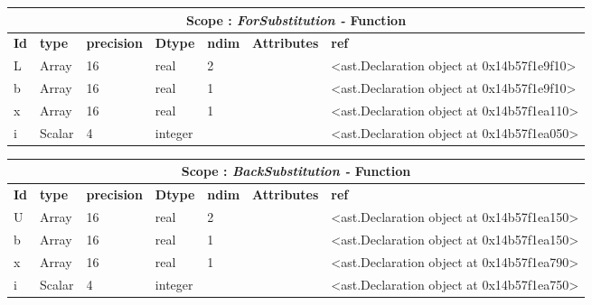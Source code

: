 \documentclass{report}
\begin{document}
\begin{center}
\begin{longtable}{|p{3.5cm}|p{1.5cm}|p{1.5cm}|p{1.5cm}|p{1cm}|p{2cm}|p{4cm}| }
\hline
\multicolumn{7}{|c|}{\textbf{Scope : \qquad}  \textbf{\textit{ForSubstitution - }Function}}\\ 
\hline
\textbf{Id} & \textbf{type} & \textbf{precision} & \textbf{Dtype} & \textbf{ndim} & \textbf{Attributes} & \textbf{ref} \\\hline

L & Array & 16 & real & 2 &  & <ast.Declaration object at 0x14b57f1e9f10> \\\hline

b & Array & 16 & real & 1 &  & <ast.Declaration object at 0x14b57f1e9f10> \\\hline

x & Array & 16 & real & 1 &  & <ast.Declaration object at 0x14b57f1ea110> \\\hline

i & Scalar & 4 & integer &  &  & <ast.Declaration object at 0x14b57f1ea050> \\\hline

\end{longtable}
\end{center}

 \vspace{1cm}

\begin{center}
\begin{longtable}{|p{3.5cm}|p{1.5cm}|p{1.5cm}|p{1.5cm}|p{1cm}|p{2cm}|p{4cm}| }
\hline
\multicolumn{7}{|c|}{\textbf{Scope : \qquad}  \textbf{\textit{BackSubstitution - }Function}}\\ 
\hline
\textbf{Id} & \textbf{type} & \textbf{precision} & \textbf{Dtype} & \textbf{ndim} & \textbf{Attributes} & \textbf{ref} \\\hline

U & Array & 16 & real & 2 &  & <ast.Declaration object at 0x14b57f1ea150> \\\hline

b & Array & 16 & real & 1 &  & <ast.Declaration object at 0x14b57f1ea150> \\\hline

x & Array & 16 & real & 1 &  & <ast.Declaration object at 0x14b57f1ea790> \\\hline

i & Scalar & 4 & integer &  &  & <ast.Declaration object at 0x14b57f1ea750> \\\hline

\end{longtable}
\end{center}
\end{document}

